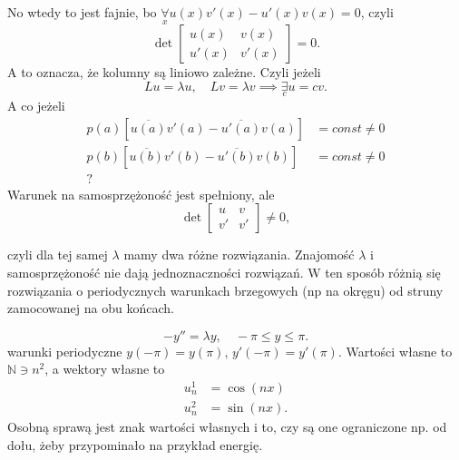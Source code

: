 \documentclass[../main.tex]{subfiles}
\begin{document}
		No wtedy to jest fajnie, bo $\underset{x}{\forall} u(x)v'(x) - u'(x)v(x) = 0$, czyli
		\[
				\det\begin{bmatrix} u(x)&v(x)\\u'(x)&v'(x) \end{bmatrix} = 0
		.\]
		A to oznacza, że kolumny są liniowo zależne. Czyli jeżeli
		 \[
		Lu = \lambda u,\quad Lv = \lambda v \implies \underset{c}{\exists} u = cv
		.\]
		A co jeżeli
		\begin{align*}
				p(a)\left[\overline{u(a)}v'(a) - \overline{u'(a)}v(a)\right] &= const \neq 0\\
				p(b)\left[\overline{u(b)}v'(b) - \overline{u'(b)}v(b)\right] &= const \neq 0\\
		?\end{align*}
		Warunek na samosprzężoność jest spełniony, ale
		\[
				\det\begin{bmatrix} u&v\\v'&v' \end{bmatrix} \neq 0
		,\]

		czyli dla tej samej $\lambda$ mamy dwa różne rozwiązania. Znajomość $\lambda$ i samosprzężoność nie dają jednoznaczności rozwiązań. W ten sposób różnią się rozwiązania o periodycznych warunkach brzegowych (np na okręgu) od struny zamocowanej na obu końcach.
		\begin{przyklad}
				\[
				-y'' = \lambda y,\quad -\pi\le y\le \pi
				.\]
				warunki periodyczne $y(-\pi) = y(\pi)$, $y'(-\pi) = y'(\pi)$.
				Wartości własne to $\mathbb{N}\ni n^2$, a wektory własne to
				\begin{align*}
						u_n^1&= \cos(nx)\\
						u_n^2&= \sin(nx)
				.\end{align*}
				Osobną sprawą jest znak wartości własnych i to, czy są one ograniczone np. od dołu, żeby przypominało na przykład energię.
		\end{przyklad}
\end{document}
